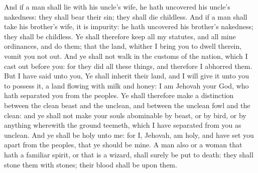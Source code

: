 And if a man shall lie with his uncle’s wife, he hath uncovered his uncle’s nakedness: they shall bear their sin; they shall die childless. And if a man shall take his brother’s wife, it is impurity: he hath uncovered his brother’s nakedness; they shall be childless.  Ye shall therefore keep all my statutes, and all mine ordinances, and do them; that the land, whither I bring you to dwell therein, vomit you not out. And ye shall not walk in the customs of the nation, which I cast out before you: for they did all these things, and therefore I abhorred them. But I have said unto you, Ye shall inherit their land, and I will give it unto you to possess it, a land flowing with milk and honey: I am Jehovah your God, who hath separated you from the peoples. Ye shall therefore make a distinction between the clean beast and the unclean, and between the unclean fowl and the clean: and ye shall not make your souls abominable by beast, or by bird, or by anything wherewith the ground teemeth, which I have separated from you as unclean. And ye shall be holy unto me: for I, Jehovah, am holy, and have set you apart from the peoples, that ye should be mine.  A man also or a woman that hath a familiar spirit, or that is a wizard, shall surely be put to death: they shall stone them with stones; their blood shall be upon them. 

